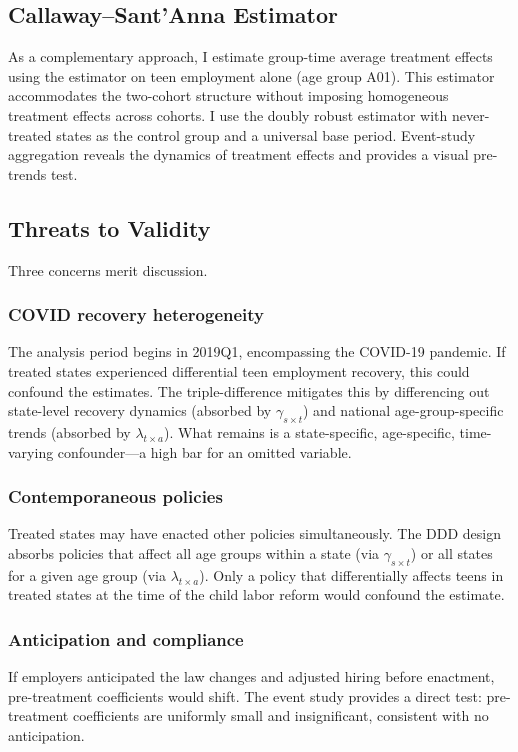 \documentclass[12pt]{article}
\begin{document}
\subsection{Callaway--Sant'Anna Estimator}

As a complementary approach, I estimate group-time average treatment effects using the \citet{callaway2021difference} estimator on teen employment alone (age group A01). This estimator accommodates the two-cohort structure without imposing homogeneous treatment effects across cohorts. I use the doubly robust estimator with never-treated states as the control group and a universal base period. Event-study aggregation reveals the dynamics of treatment effects and provides a visual pre-trends test.

\subsection{Threats to Validity}

Three concerns merit discussion.

\subsubsection*{COVID recovery heterogeneity} The analysis period begins in 2019Q1, encompassing the COVID-19 pandemic. If treated states experienced differential teen employment recovery, this could confound the estimates. The triple-difference mitigates this by differencing out state-level recovery dynamics (absorbed by $\gamma_{s \times t}$) and national age-group-specific trends (absorbed by $\lambda_{t \times a}$). What remains is a state-specific, age-specific, time-varying confounder---a high bar for an omitted variable.

\subsubsection*{Contemporaneous policies} Treated states may have enacted other policies simultaneously. The DDD design absorbs policies that affect all age groups within a state (via $\gamma_{s \times t}$) or all states for a given age group (via $\lambda_{t \times a}$). Only a policy that differentially affects teens in treated states at the time of the child labor reform would confound the estimate.

\subsubsection*{Anticipation and compliance} If employers anticipated the law changes and adjusted hiring before enactment, pre-treatment coefficients would shift. The event study provides a direct test: pre-treatment coefficients are uniformly small and insignificant, consistent with no anticipation.
\end{document}
